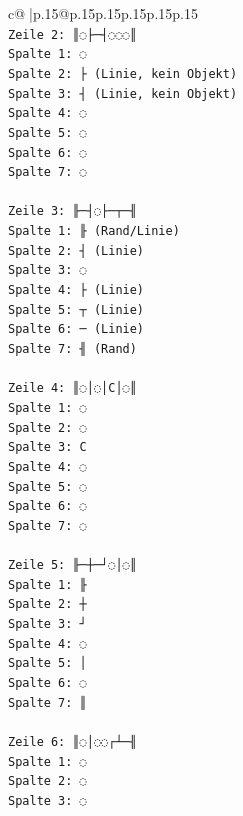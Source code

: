 \documentclass{article}
\begin{document}
{\begin{supertabular}{c@{$\;$}|p{.15\linewidth}@{}p{.15\linewidth}p{.15\linewidth}p{.15\linewidth}p{.15\linewidth}p{.15\linewidth}}
{{{\\ 
\texttt{Zeile 2: ║◌├─┤◌◌◌║} \\
\texttt{Spalte 1: ◌} \\
\texttt{Spalte 2: ├ (Linie, kein Objekt)} \\
\texttt{Spalte 3: ┤ (Linie, kein Objekt)} \\
\texttt{Spalte 4: ◌} \\
\texttt{Spalte 5: ◌} \\
\texttt{Spalte 6: ◌} \\
\texttt{Spalte 7: ◌} \\
\\ 
\texttt{Zeile 3: ╟─┤◌├─┬─╢} \\
\texttt{Spalte 1: ╟ (Rand/Linie)} \\
\texttt{Spalte 2: ┤ (Linie)} \\
\texttt{Spalte 3: ◌} \\
\texttt{Spalte 4: ├ (Linie)} \\
\texttt{Spalte 5: ┬ (Linie)} \\
\texttt{Spalte 6: ─ (Linie)} \\
\texttt{Spalte 7: ╢ (Rand)} \\
\\ 
\texttt{Zeile 4: ║◌│◌│C│◌║} \\
\texttt{Spalte 1: ◌} \\
\texttt{Spalte 2: ◌} \\
\texttt{Spalte 3: C} \\
\texttt{Spalte 4: ◌} \\
\texttt{Spalte 5: ◌} \\
\texttt{Spalte 6: ◌} \\
\texttt{Spalte 7: ◌} \\
\\ 
\texttt{Zeile 5: ╟─┼─┘◌│◌║} \\
\texttt{Spalte 1: ╟} \\
\texttt{Spalte 2: ┼} \\
\texttt{Spalte 3: ┘} \\
\texttt{Spalte 4: ◌} \\
\texttt{Spalte 5: │} \\
\texttt{Spalte 6: ◌} \\
\texttt{Spalte 7: ║} \\
\\ 
\texttt{Zeile 6: ║◌│◌◌┌┴─╢} \\
\texttt{Spalte 1: ◌} \\
\texttt{Spalte 2: ◌} \\
\texttt{Spalte 3: ◌} \\
}}}
\end{supertabular}}
\end{document}
